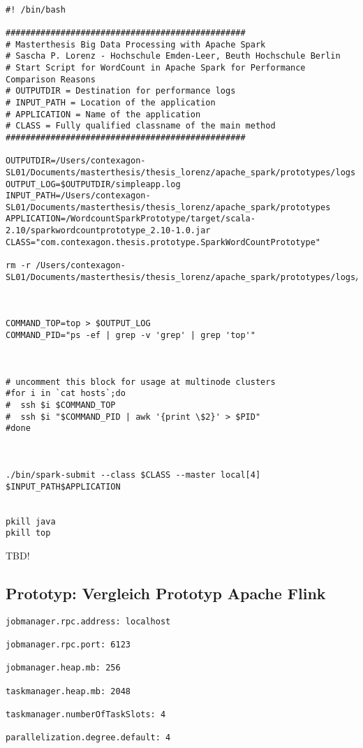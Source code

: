 \begin{lstlisting}[label=sparkshell,caption=ShellScript zum Start des Spark-WordCount-Prototyp]

#! /bin/bash

################################################
# Masterthesis Big Data Processing with Apache Spark
# Sascha P. Lorenz - Hochschule Emden-Leer, Beuth Hochschule Berlin
# Start Script for WordCount in Apache Spark for Performance Comparison Reasons	
# OUTPUTDIR = Destination for performance logs
# INPUT_PATH = Location of the application 
# APPLICATION = Name of the application
# CLASS = Fully qualified classname of the main method
################################################

OUTPUTDIR=/Users/contexagon-SL01/Documents/masterthesis/thesis_lorenz/apache_spark/prototypes/logs
OUTPUT_LOG=$OUTPUTDIR/simpleapp.log
INPUT_PATH=/Users/contexagon-SL01/Documents/masterthesis/thesis_lorenz/apache_spark/prototypes
APPLICATION=/WordcountSparkPrototype/target/scala-2.10/sparkwordcountprototype_2.10-1.0.jar
CLASS="com.contexagon.thesis.prototype.SparkWordCountPrototype"

rm -r /Users/contexagon-SL01/Documents/masterthesis/thesis_lorenz/apache_spark/prototypes/logs/sparkOutput.out



COMMAND_TOP=top > $OUTPUT_LOG
COMMAND_PID="ps -ef | grep -v 'grep' | grep 'top'"



# uncomment this block for usage at multinode clusters
#for i in `cat hosts`;do
#  ssh $i $COMMAND_TOP
#  ssh $i "$COMMAND_PID | awk '{print \$2}' > $PID"
#done



./bin/spark-submit --class $CLASS --master local[4] $INPUT_PATH$APPLICATION


pkill java
pkill top

\end{lstlisting}

TBD!

\subsection{Prototyp: Vergleich Prototyp Apache Flink }
\label{section:vergleich apache flink}


\begin{lstlisting}[label=flink config,caption=Konfigurationseinstellungen der lokalen Flink-Installation]
jobmanager.rpc.address: localhost

jobmanager.rpc.port: 6123

jobmanager.heap.mb: 256

taskmanager.heap.mb: 2048

taskmanager.numberOfTaskSlots: 4

parallelization.degree.default: 4
\end{lstlisting}

